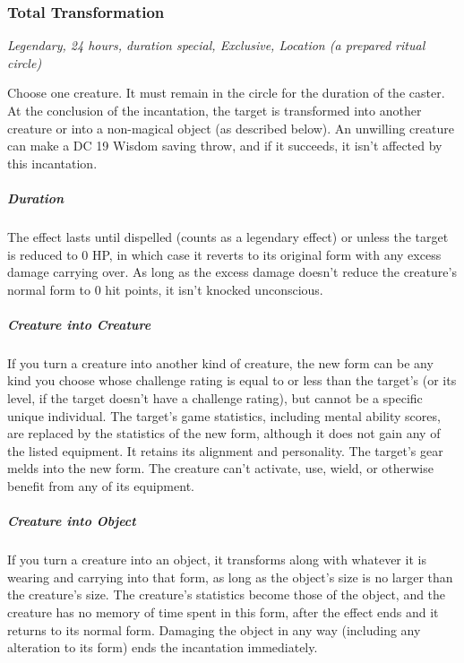 \subsubsection{Total Transformation}
\textit{Legendary, 24 hours, duration special, Exclusive, Location (a prepared ritual circle)}

Choose one creature. It must remain in the circle for the duration of the caster.  At the conclusion of the incantation, the target is transformed into another creature or into a non-magical object (as described below). An unwilling creature can make a DC 19 Wisdom saving throw, and if it succeeds, it isn't affected by this incantation.

\subparagraph*{Duration} The effect lasts until dispelled (counts as a legendary effect) or unless the target is reduced to 0 HP, in which case it reverts to its original form with any excess damage carrying over. As long as the excess damage doesn't reduce the creature's normal form to 0 hit points, it isn't knocked unconscious.

\subparagraph*{Creature into Creature} If you turn a creature into another kind of creature, the new form can be any kind you choose whose challenge rating is equal to or less than the target's (or its level, if the target doesn't have a challenge rating), but cannot be a specific unique individual. The target's game statistics, including mental ability scores, are replaced by the statistics of the new form, although it does not gain any of the listed equipment. It retains its alignment and personality.
The target's gear melds into the new form. The creature can't activate, use, wield, or otherwise benefit from any of its equipment.

\subparagraph*{Creature into Object} If you turn a creature into an object, it transforms along with whatever it is wearing and carrying into that form, as long as the object's size is no larger than the creature's size. The creature's statistics become those of the object, and the creature has no memory of time spent in this form, after the effect ends and it returns to its normal form. Damaging the object in any way (including any alteration to its form) ends the incantation immediately.



